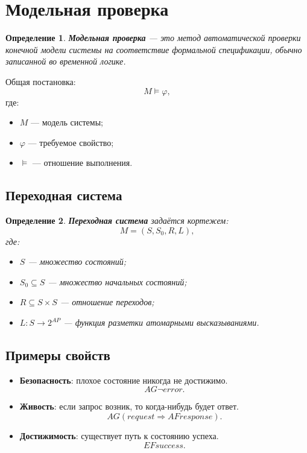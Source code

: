 \documentclass[12pt,a4paper]{article}
\newtheorem{definition}{Определение}
\begin{document}
\section{Модельная проверка}

\begin{definition}
\textbf{Модельная проверка} --- это метод автоматической проверки конечной модели системы на соответствие формальной спецификации, обычно записанной во временной логике.
\end{definition}

Общая постановка:
\[
    M \models \varphi,
\]
где:
\begin{itemize}
    \item $M$ --- модель системы;
    \item $\varphi$ --- требуемое свойство;
    \item $\models$ --- отношение выполнения.
\end{itemize}

\subsection{Переходная система}

\begin{definition}
\textbf{Переходная система} задаётся кортежем:
\[
    M = (S, S_0, R, L),
\]
где:
\begin{itemize}
    \item $S$ --- множество состояний;
    \item $S_0 \subseteq S$ --- множество начальных состояний;
    \item $R \subseteq S \times S$ --- отношение переходов;
    \item $L: S \to 2^{AP}$ --- функция разметки атомарными высказываниями.
\end{itemize}
\end{definition}

\subsection{Примеры свойств}

\begin{itemize}
    \item \textbf{Безопасность}: плохое состояние никогда не достижимо.
    \[
        AG \neg error.
    \]

    \item \textbf{Живость}: если запрос возник, то когда-нибудь будет ответ.
    \[
        AG(request \Rightarrow AF response).
    \]

    \item \textbf{Достижимость}: существует путь к состоянию успеха.
    \[
        EF success.
    \]
\end{itemize}
\end{document}
